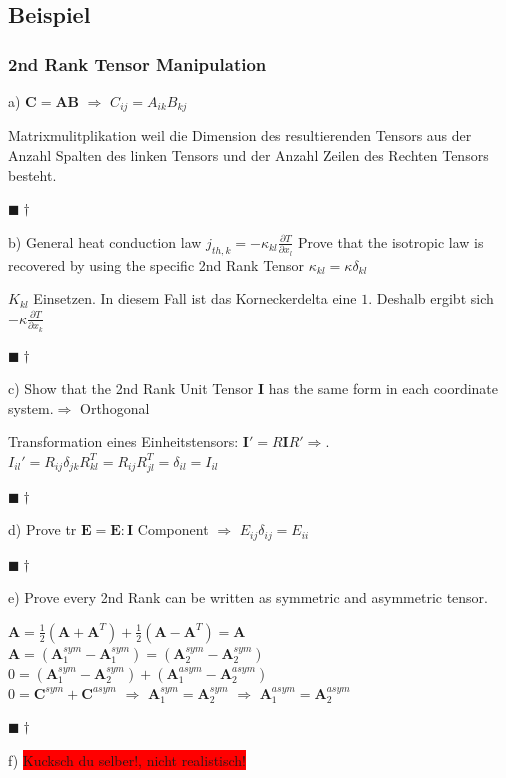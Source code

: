 \documentclass[a4paper]{scrartcl}
\newcommand{\qed}{\begin{flushright}
$\blacksquare \dagger$ \end{flushright}}
\begin{document}
\subsection{Beispiel}

\subsubsection{2nd Rank Tensor Manipulation}

a) $\mathbf{C}=\mathbf{AB}$ $\Rightarrow$ $C_{ij}=A_{ik}B_{kj}$

Matrixmulitplikation weil die Dimension des resultierenden Tensors aus der
Anzahl Spalten des linken Tensors und der Anzahl Zeilen des Rechten Tensors
besteht. \qed

b) General heat conduction law $j_{th,k}=-\kappa_{kl}\frac{\partial
T}{\partial x_l}$ Prove that the isotropic law is recovered by using the
specific 2nd Rank Tensor $\kappa_{kl}=\kappa \delta_{kl}$

$K_{kl}$ Einsetzen. In diesem Fall ist das Korneckerdelta eine $1$. Deshalb
ergibt sich $-\kappa \frac{\partial T}{\partial x_k}$ \qed

c) Show that the 2nd Rank Unit Tensor $\mathbf{I}$ has the same form in each
coordinate system.$\Rightarrow$ Orthogonal

Transformation eines Einheitstensors: $\mathbf{I}'=R\mathbf{I}R'\Rightarrow$.
$I_{il}'=R_{ij}\delta_{jk}R_{kl}^T = R_{ij}R_{jl}^T=\delta_{il}=I_{il}$ \qed



d) Prove tr $\mathbf{E}=\mathbf{E : I}$
Component $\Rightarrow$ $E_{ij}\delta_{ij}=E_{ii}$ \qed

e) Prove every 2nd Rank can be written as symmetric and asymmetric tensor.

$\mathbf{A}=\frac{1}{2}\left(\mathbf{A} + \mathbf{A}^T\right)+
\frac{1}{2}\left(\mathbf{A}-\mathbf{A}^T\right) = \mathbf{A}$ \\
$\mathbf{A}=\left(\mathbf{A}_1^{sym}-\mathbf{A}_1^{sym}\right)=\left(\mathbf{A}_2^{sym}-\mathbf{A}_2^{sym}\right)$
\\
$0=\left(\mathbf{A}_1^{sym}-\mathbf{A}_2^{sym}\right)+\left(\mathbf{A}_1^{asym}-\mathbf{A}_2^{asym}\right)$
\\
$0=\mathbf{C}^{sym}+\mathbf{C}^{asym}$ $\Rightarrow$
$\mathbf{A}_1^{sym}=\mathbf{A}_2^{sym}$ $\Rightarrow$
$\mathbf{A}_1^{asym}=\mathbf{A}_2^{asym}$ \qed


f) \colorbox{red}{Kucksch du selber!, nicht realistisch!}
\end{document}
